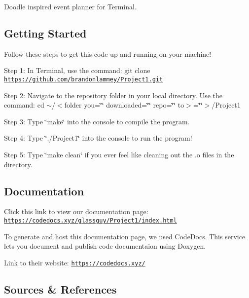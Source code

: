 Doodle inspired event planner for Terminal.

\subsection*{Getting Started}

Follow these steps to get this code up and running on your machine!

Step 1\+: In Terminal, use the command\+: git clone \href{https://github.com/brandonlammey/Project1.git}{\tt https\+://github.\+com/brandonlammey/\+Project1.\+git}

Step 2\+: Navigate to the repository folder in your local directory. Use the command\+: cd $\sim$/$<$folder you=\char`\"{}\char`\"{} downloaded=\char`\"{}\char`\"{} repo=\char`\"{}\char`\"{} to$>$=\char`\"{}\char`\"{}$>$/\+Project1

Step 3\+: Type \char`\"{}make\char`\"{} into the console to compile the program.

Step 4\+: Type \char`\"{}./\+Project1\char`\"{} into the console to run the program!

Step 5\+: Type \char`\"{}make clean\char`\"{} if you ever feel like cleaning out the .o files in the directory.

\subsection*{Documentation}

Click this link to view our documentation page\+: \href{https://codedocs.xyz/glassguy/Project1/index.html}{\tt https\+://codedocs.\+xyz/glassguy/\+Project1/index.\+html}

To generate and host this documentation page, we used Code\+Docs. This service lets you document and publish code documentaion using Doxygen.

Link to their website\+: \href{https://codedocs.xyz/}{\tt https\+://codedocs.\+xyz/}

\subsection*{Sources \& References}

